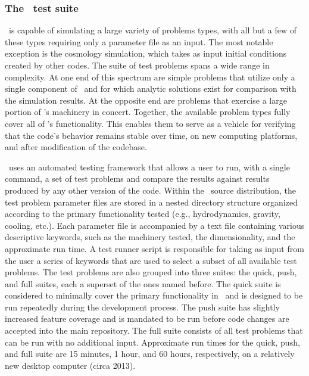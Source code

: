 \subsubsection{The \enzo\ test suite}
\label{sec.tests.suite}

\enzo\ is capable of simulating a large variety of problems types,
with all but a few of these types requiring only a parameter file as
an input.  The most notable exception is the cosmology simulation,
which takes as input initial conditions created by other codes.  The
suite of test problems spans a wide range in complexity.  At one end
of this spectrum are simple problems that utilize only a single
component of \enzo\ and for which analytic solutions exist for
comparison with the simulation results.  At the opposite end are
problems that exercise a large portion of \enzo's machinery in
concert.  Together, the available problem types fully cover all of
\enzo's functionality.  This enables them to serve as a vehicle for
verifying that the code's behavior remains stable over time, on new
computing platforms, and after modification of the codebase.

\enzo\ uses an automated testing framework that allows a user to run,
with a single command, a set of test problems and compare the results
against results produced by any other version of the code.  Within the
\enzo\ source distribution, the test problem parameter files are
stored in a nested directory structure organized according to the
primary functionality tested (e.g., hydrodynamics, gravity, cooling,
etc.).  Each parameter file is accompanied by a text file containing
various descriptive keywords, such as the machinery tested, the
dimensionality, and the approximate run time.  A test runner script is
responsible for taking as input from the user a series of keywords
that are used to select a subset of all available test problems.  The
test problems are also grouped into three suites: the quick, push, and
full suites, each a superset of the ones named before.  The quick
suite is considered to minimally cover the primary functionality in
\enzo\ and is designed to be run repeatedly during the development
process.  The push suite has slightly increased feature coverage and
is mandated to be run before code changes are accepted into the main
repository.  The full suite consists of all test problems that can be
run with no additional input.  Approximate run times for the quick,
push, and full suite are 15 minutes, 1 hour, and 60 hours,
respectively, on a relatively new desktop computer (circa 2013).

